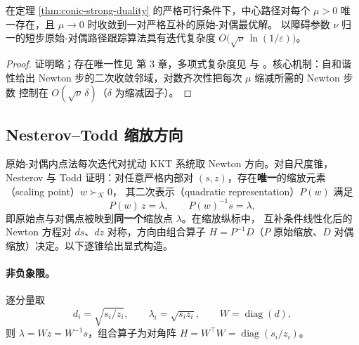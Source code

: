 \begin{theorem}
在定理 \ref{thm:conic-strong-duality} 的严格可行条件下，中心路径对每个
$\mu > 0$ 唯一存在，且 $\mu \to 0$ 时收敛到一对严格互补的原始-对偶最优解。
以障碍参数 $\nu$ 归一的短步原始-对偶路径跟踪算法具有迭代复杂度
$O\!\big(\sqrt{\nu}\, \ln(1/\varepsilon)\big)$。
\end{theorem}
\begin{proof}
证明略；存在唯一性见 \cite{nesterov1994} 第 3 章，多项式复杂度见
\cite{nesterov1994} 与 \cite{nesterov1998}。核心机制：自和谐性给出
Newton 步的二次收敛邻域，对数齐次性把每次 $\mu$ 缩减所需的 Newton 步数
控制在 $O(\sqrt{\nu}\, \delta)$（$\delta$ 为缩减因子）。
\end{proof}

\subsection{Nesterov--Todd 缩放方向}
\label{subsec:nt-scaling}

原始-对偶内点法每次迭代对扰动 KKT 系统取 Newton 方向。对自尺度锥，
Nesterov 与 Todd \cite{nesterov1997,nesterov1998} 证明：对任意严格内部对
$(s, z)$，存在\textbf{唯一}的缩放元素（scaling point）$w \succ_{\mathcal{K}} 0$，
其二次表示（quadratic representation）$P(w)$ 满足
\begin{equation}
\label{eq:nt-scaling}
P(w)\, z = \lambda, \qquad P(w)^{-1} s = \lambda,
\end{equation}
即原始点与对偶点被映到\textbf{同一个}缩放点 $\lambda$。在缩放纵标中，
互补条件线性化后的 Newton 方程对 $ds$、$dz$ 对称，方向由组合算子
$H = P^{-1} D$（$P$ 原始缩放、$D$ 对偶缩放）决定。以下逐锥给出显式构造。

\paragraph{非负象限。}逐分量取
\[
d_i = \sqrt{s_i / z_i}, \qquad \lambda_i = \sqrt{s_i z_i}, \qquad W = \operatorname{diag}(d),
\]
则 $\lambda = W z = W^{-1} s$，组合算子为对角阵
$H = W^\top W = \operatorname{diag}(s_i / z_i)$。

